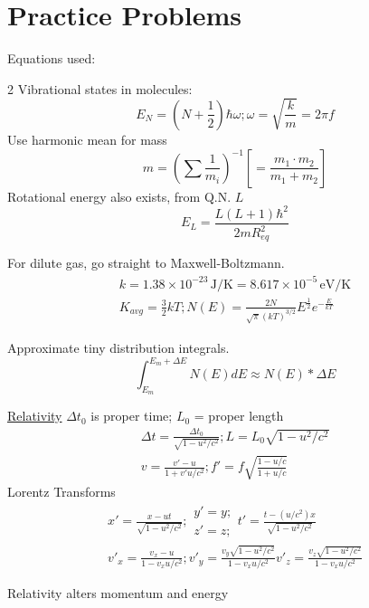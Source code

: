 \documentclass[12pt]{report}
\newcommand{\e}[1]{e^{#1}}
\newcommand{\E}[1]{\times 10^{#1}}
\begin{document}

\footnotesize
\chapter*{Practice Problems}
Equations used:
\begin{multicols}{2}
    Vibrational states in molecules:
    \begin{equation*}
        E_N = (N + \frac{1}{2})\hbar \omega; 
        \omega = \sqrt{\frac{k}{m}} = 2\pi f
    \end{equation*}
    Use harmonic mean for mass
    \begin{equation*}
        m = \left( \sum \frac{1}{m_i} \right)^{-1} \left[ = \frac{m_1 \cdot m_2}{m_1 + m_2} \right]
    \end{equation*}
    Rotational energy also exists, from Q.N. $L$
    \begin{equation*}
        E_L = \frac{L(L+1)\hbar^2}{2mR_{eq}^2}
    \end{equation*}

    For dilute gas, go straight to Maxwell-Boltzmann.
    \begin{gather*}
        k = 1.38\E{-23}\,\unit{\joule/\kelvin} = 8.617\E{-5}\,\unit{\eV/\kelvin}\\
        K_{avg} = \frac{3}{2}kT;
        N(E) = \frac{2N}{\sqrt{\pi}(kT)^{3/2}}E^{\frac{1}{2}}\e{-\frac{E}{kT}}
    \end{gather*}

    Approximate tiny distribution integrals.
    \begin{equation*}
        \int_{E_m}^{E_m + \Delta E} N(E) dE \approx N(E) * \Delta E
    \end{equation*}

    \underline{Relativity}
        $\Delta t_0$ is proper time; $L_0$ = proper length
        \begin{gather*}
            \Delta t = \frac{\Delta t_0}{\sqrt{1 - u^2/c^2}}; 
            L = L_0\sqrt{1 - u^2/c^2}\\
            v = \frac{v' - u}{1 + v'u/c^2}; 
            f' = f\sqrt{\frac{1 - u/c}{1 + u/c}}
        \end{gather*}
        Lorentz Transforms
        \footnotesize
        \begin{gather*}
            x' = \frac{x - ut}{\sqrt{1 - u^2/c^2}};
            \begin{matrix}
                y' = y;\\
                z' = z;
            \end{matrix}
            t' = \frac{t - (u/c^2)x}{\sqrt{1 - u^2/c^2}}\\
            v'_x = \frac{v_x - u}{1 - v_x u/c^2};
            v'_y = \frac{v_y \sqrt{1 - u^2 / c^2}}{1 - v_x u/c^2}
            v'_z = \frac{v_z \sqrt{1 - u^2 / c^2}}{1 - v_x u/c^2}
        \end{gather*}
        \normalsize

        Relativity alters momentum and energy

\end{multicols}
\end{document}
